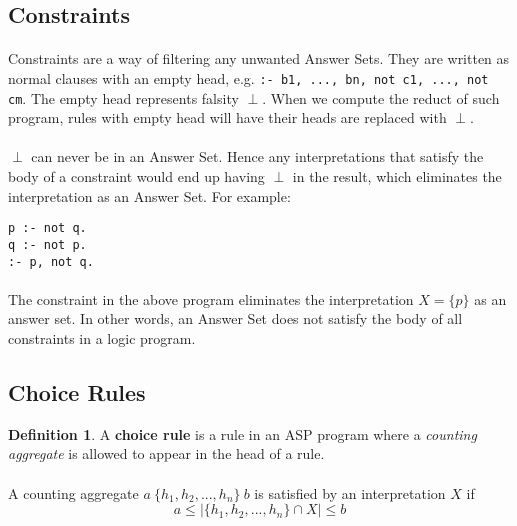 \documentclass{article}
\theoremstyle{plain}
\theoremstyle{definition}
\newtheorem{defn}[thm]{Definition} %
\begin{document}
\begin{multicols}{2}
\subsection{Constraints}

\paragraph{} Constraints are a way of filtering any unwanted Answer Sets. They are written as normal clauses with an empty head, e.g. \lstinline{:- b1, ..., bn, not c1, ..., not cm}. The empty head represents falsity $\perp$. When we compute the reduct of such program, rules with empty head will have their heads are replaced with $\perp$. 

\paragraph{} $\perp$ can never be in an Answer Set. Hence any interpretations that satisfy the body of a constraint would end up having $\perp$ in the result, which eliminates the interpretation as an Answer Set. For example:

\begin{lstlisting}
p :- not q.
q :- not p.
:- p, not q.
\end{lstlisting}

\paragraph{} The constraint in the above program eliminates the interpretation $X = \{p\}$ as an answer set. In other words, an Answer Set does not satisfy the body of all constraints in a logic program.

\subsection{Choice Rules}\label{sec:ASPChoiceRules}

\begin{defn}A \textbf{choice rule} is a rule in an ASP program where a \textit{counting aggregate} is allowed to appear in the head of a rule.\end{defn}

\paragraph{} A counting aggregate $a\ \{ h_1, h_2, ..., h_n \}\ b$ is satisfied by an interpretation $X$ if $$a \leq |\{h_1, h_2, ..., h_n \} \cap X| \leq b$$


\end{multicols}
\end{document}

